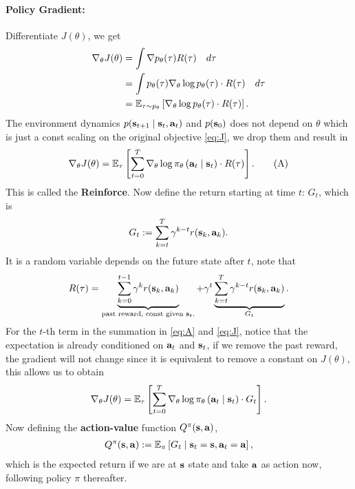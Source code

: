 \documentclass[11pt]{article}  %
\begin{document}
\paragraph{Policy Gradient:}
Differentiate $J(\theta)$, we get 
\begin{align*}
  \nabla_{\theta} J(\theta) &= \int \nabla p_\theta(\tau) R(\tau) \quad d\tau \\
  &= \int p_\theta(\tau) \nabla_{\theta} \log p_{\theta}(\tau) \cdot R(\tau) \quad d\tau \\
  &= \mathbb{E}_{\tau \sim p_\theta}\left[\nabla_\theta\log p_{\theta}(\tau)\cdot R(\tau)\right].
\end{align*}
The environment dynamics $p(\mathbf{s}_{t+1}\mid \mathbf{s}_t, \mathbf{a}_t)$ and $p(\mathbf{s}_0)$ does not depend on $\theta$ which is just a const scaling on the original objective \eqref{eq:J}, we drop them and result in
\begin{align}
  \label{eq:A}
  \nabla_{\theta} J(\theta) = \mathbb{E}_{\tau}\left[\sum_{t=0}^{T}\nabla_\theta \log \pi_{\theta}\left( \mathbf{a}_t \mid \mathbf{s}_t \right) \cdot R(\tau)\right]. \tag{A}
\end{align}
This is called the \textbf{Reinforce}.
Now define the return starting at time $t$: $G_t$, which is 
\begin{align*}
  G_t := \sum_{k=t}^{T}\gamma^{k - t}r(\mathbf{s}_k, \mathbf{a}_k).
\end{align*}
It is a random variable depends on the future state after $t$, note that 
\begin{align*}
  R(\tau) = \underbrace{\sum_{k=0}^{t-1}\gamma^k r(\mathbf{s}_k, \mathbf{a}_k)}_{\text{past reward, const given $\mathbf{s}_t$.}} + \gamma^t\underbrace{\sum_{k=t}^{T}\gamma^{k-t}r(\mathbf{s}_k, \mathbf{a}_k)}_{G_t}.
\end{align*}
For the $t$-th term in the summation in \eqref{eq:A} and \eqref{eq:J}, notice that the expectation is already conditioned on $\mathbf{a}_t$ and $\mathbf{s}_t$, if we remove the past reward, the gradient will not change since it is equivalent to remove a constant on $J(\theta)$, this allows us to obtain 
\begin{align}
  \label{eq:JG}
  \nabla_{\theta} J(\theta) = \mathbb{E}_{\tau}\left[\sum_{t=0}^{T}\nabla_\theta \log \pi_{\theta}\left( \mathbf{a}_t \mid \mathbf{s}_t \right) \cdot G_t\right].
\end{align}
Now defining the \textbf{action-value} function $Q^{\pi}(\mathbf{s}, \mathbf{a})$,
\begin{align*}
  Q^{\pi}(\mathbf{s}, \mathbf{a}) := \mathbb{E}_{\pi}\left[G_t \mid \mathbf{s}_t = \mathbf{s}, \mathbf{a}_t = \mathbf{a}\right],
\end{align*}
which is the expected return if we are at $\mathbf{s}$ state and take $\mathbf{a}$ as action now, following policy $\pi$ thereafter.
\end{document}
